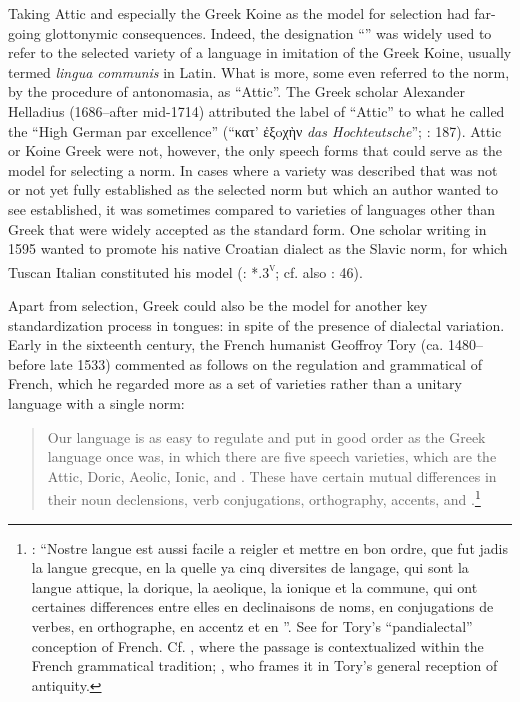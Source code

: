Taking Attic and especially the Greek Koine as the model for selection had far-going glottonymic consequences. Indeed, the designation “” was widely used to refer to the selected variety of a  language in imitation of the Greek Koine, usually termed \textit{lingua communis} in Latin. What is more, some even referred to the  norm, by the procedure of antonomasia, as “Attic”. The Greek scholar Alexander Helladius (1686–after mid-1714) attributed the label of “Attic” to what he called the “High German par excellence” (“κατ’ ἐξoχὴν \textit{das Hochteutsche}”; \citealt{Helladius1714}: 187). Attic or Koine Greek were not, however, the only speech forms that could serve as the model for selecting a  norm. In cases where a  variety was described that was not or not yet fully established as the selected norm but which an author wanted to see established, it was sometimes compared to varieties of languages other than Greek that were widely accepted as the standard form. One scholar writing in 1595 wanted to promote his native Croatian dialect as the Slavic norm, for which Tuscan Italian constituted his model (\citealt{Veranzio1595}: *.3\textsc{\textsuperscript{v}}; cf. also \citealt{Schoppe1636}: 46).

Apart from selection, Greek could also be the model for another key standardization process in  tongues:  in spite of the presence of dialectal variation. Early in the sixteenth century, the French humanist Geoffroy Tory (ca. 1480–before late 1533) commented as follows on the regulation and grammatical  of French, which he regarded more as a set of varieties rather than a unitary language with a single norm:

\begin{quote}
Our language is as easy to regulate and put in good order as the Greek language once was, in which there are five speech varieties, which are the Attic, Doric, Aeolic, Ionic, and . These have certain mutual differences in their noun declensions, verb conjugations, orthography, accents, and .\footnote{\citet[\textsc{iv}\textsc{\textsuperscript{v}}\textsc{–v}\textsc{\textsuperscript{r}}]{Tory1529}: “Nostre langue est aussi facile a reigler et mettre en bon ordre, que fut jadis la langue grecque, en la quelle ya cinq diversites de langage, qui sont la langue attique, la dorique, la aeolique, la ionique et la commune, qui ont certaines differences entre elles en declinaisons de noms, en conjugations de verbes, en orthographe, en accentz et en ”. See \citet[466--467]{Trudeau1983} for Tory’s “pandialectal” conception of French. Cf. \citet[19--20]{Defaux2003}, where the passage is contextualized within the French grammatical tradition; \citet[23]{Cordier2006}, who frames it in Tory’s general reception of antiquity.}
\end{quote}

